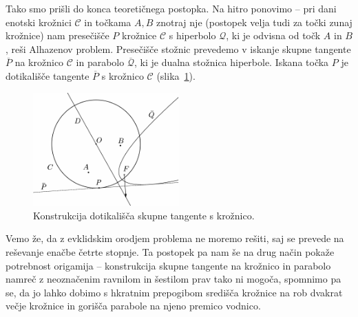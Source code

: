 Tako smo prišli do konca teoretičnega postopka. Na hitro ponovimo -- pri dani enotski krožnici $\mathcal{C}$ in točkama $A, B$ znotraj nje (postopek velja tudi za točki zunaj krožnice) nam presečišče $P$ krožnice $\mathcal{C}$ s hiperbolo $\mathcal{Q}$, ki je odvisna od točk $A$ in $B$, reši Alhazenov problem. Presečišče stožnic prevedemo v iskanje skupne tangente $\overline{P}$ na krožnico $\mathcal{C}$ in parabolo $\mathcal{\overline{Q}}$, ki je dualna stožnica hiperbole. Iskana točka $P$ je dotikališče tangente $\overline{P}$ s krožnico $\mathcal{C}$ (slika~\ref{fig:huygens3}).

\begin{figure}[h]
    \centering
    \includegraphics[width=0.5\textwidth]{images/alhazen/huygens3.png}
    \caption[Huygensova rešitev]{Konstrukcija dotikališča skupne tangente s krožnico.}
    \label{fig:huygens3}
\end{figure}

Vemo že, da z evklidskim orodjem problema ne moremo rešiti, saj se prevede na reševanje enačbe četrte stopnje. Ta postopek pa nam še na drug način pokaže potrebnost origamija -- konstrukcija skupne tangente na krožnico in parabolo namreč z neoznačenim ravnilom in šestilom prav tako ni mogoča, spomnimo pa se, da jo lahko dobimo s hkratnim prepogibom središča krožnice na rob dvakrat večje krožnice in gorišča parabole na njeno premico vodnico.

